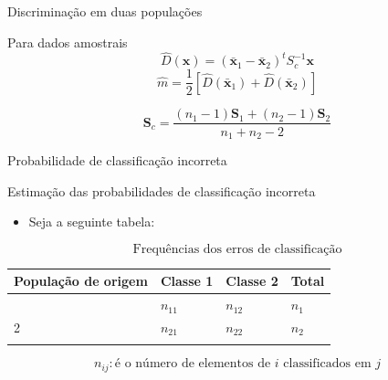 \documentclass[
  ignorenonframetext,
  aspectratio=169,
]{beamer}
\providecommand{\tightlist}{%
  \setlength{\itemsep}{0pt}\setlength{\parskip}{0pt}}
\begin{document}
\begin{frame}{Discriminação em duas populações}
\label{discriminauxe7uxe3o-em-duas-populauxe7uxf5es-6}
\begin{block}{Para dados amostrais}
\label{para-dados-amostrais-2}
\[\widehat{D}(\boldsymbol{x}) = (\bar{\boldsymbol{x}}_1 - \bar{\boldsymbol{x}}_2)^tS_c^{-1}\boldsymbol{x}\]
\[\widehat{m} = \displaystyle{\frac{1}{2}} \left[ \widehat{D}( \bar{\boldsymbol{x}}_1) + \widehat{D}(\bar{\boldsymbol{x}}_2) \right]\]

\[\boldsymbol{S}_c =  \displaystyle{\frac{(n_1 - 1) {\boldsymbol{S}_1} + (n_2 - 1) {\boldsymbol{S}_2}}{n_1 + n_2 - 2}}\]
\end{block}
\end{frame}

\begin{frame}{Probabilidade de classificação incorreta}
\label{probabilidade-de-classificauxe7uxe3o-incorreta}
\begin{block}{Estimação das probabilidades de classificação incorreta}
\label{estimauxe7uxe3o-das-probabilidades-de-classificauxe7uxe3o-incorreta}
\begin{itemize}
\tightlist
\item
  Seja a seguinte tabela:
\end{itemize}

\[\text{Frequências dos erros de classificação}\]

\begin{longtable}[]{@{}llll@{}}
\toprule\noalign{}
População de origem & Classe 1 & Classe 2 & Total \\
\midrule\noalign{}
\endhead
1 & \(n_{11}\) & \(n_{12}\) & \(n_1\) \\
2 & \(n_{21}\) & \(n_{22}\) & \(n_2\) \\
\bottomrule\noalign{}
\end{longtable}

\[n_{ij}: \text{é o número de elementos de } i \text{ classificados em } j\]
\end{block}
\end{frame}
\end{document}

